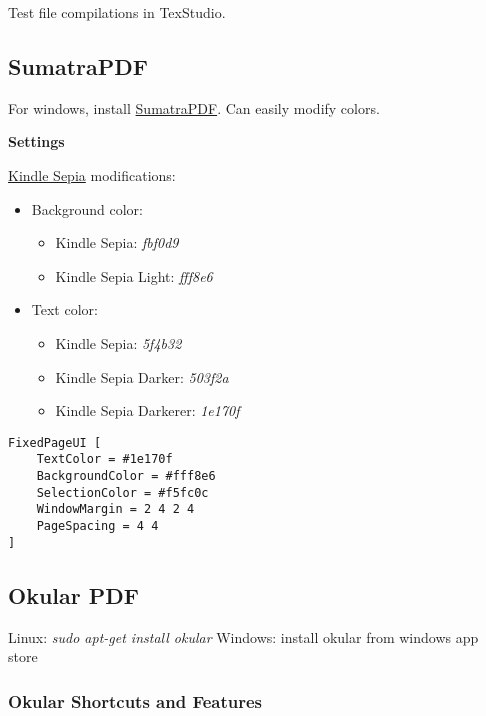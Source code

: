 \documentclass[]{article}
\providecommand{\tightlist}{%
  \setlength{\itemsep}{0pt}\setlength{\parskip}{0pt}}
\begin{document}
Test file compilations in TexStudio.

\hypertarget{sumatrapdf}{%
\subsection{SumatraPDF}\label{sumatrapdf}}

For windows, install
\href{https://www.sumatrapdfreader.org/download-free-pdf-viewer.html}{SumatraPDF}.
Can easily modify colors.

\textbf{Settings}

\href{https://medium.com/greatnote/kindle-sepia-color-code-1fed14b1a5ef}{Kindle
Sepia} modifications:

\begin{itemize}
\tightlist
\item
  Background color:

  \begin{itemize}
  \tightlist
  \item
    Kindle Sepia: \emph{fbf0d9}
  \item
    Kindle Sepia Light: \emph{fff8e6}
  \end{itemize}
\item
  Text color:

  \begin{itemize}
  \tightlist
  \item
    Kindle Sepia: \emph{5f4b32}
  \item
    Kindle Sepia Darker: \emph{503f2a}
  \item
    Kindle Sepia Darkerer: \emph{1e170f}
  \end{itemize}
\end{itemize}

\begin{verbatim}
FixedPageUI [
    TextColor = #1e170f
    BackgroundColor = #fff8e6
    SelectionColor = #f5fc0c
    WindowMargin = 2 4 2 4
    PageSpacing = 4 4
]
\end{verbatim}

\hypertarget{okular-pdf}{%
\subsection{Okular PDF}\label{okular-pdf}}

Linux: \emph{sudo apt-get install okular} Windows: install okular from
windows app store

\hypertarget{okular-shortcuts-and-features}{%
\subsubsection{Okular Shortcuts and
Features}\label{okular-shortcuts-and-features}}
\end{document}
